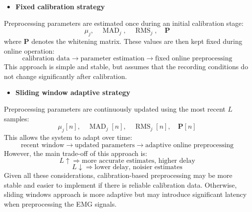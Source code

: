 \begin{itemize}
    \item \textbf{Fixed calibration strategy}
\end{itemize}
\noindent Preprocessing parameters are estimated once during an initial calibration stage:
    \[
        \mu_j,\quad \operatorname{MAD}_j,\quad \operatorname{RMS}_j,\quad \mathbf{P}
    \]
    where \(\mathbf{P}\) denotes the whitening matrix. These values are then kept fixed during online operation:
    \[
        \text{calibration data} \rightarrow \text{parameter estimation} \rightarrow \text{fixed online preprocessing}
    \]
    This approach is simple and stable, but assumes that the recording conditions do not change significantly after calibration.
\begin{itemize}
    \item \textbf{Sliding window adaptive strategy}
\end{itemize}
\noindent Preprocessing parameters are continuously updated using the most recent \(L\) samples:
    \[
        \mu_j[n],\quad \operatorname{MAD}_j[n],\quad \operatorname{RMS}_j[n],\quad \mathbf{P}[n]
    \]
    This allows the system to adapt over time:
    \[
        \text{recent window} \rightarrow \text{updated parameters} \rightarrow \text{adaptive online preprocessing}
    \]
    However, the main trade-off of this approach is:
    \[
        L \uparrow \Rightarrow \text{more accurate estimates, higher delay}
    \]
    \[
        L \downarrow \Rightarrow \text{lower delay, noisier estimates}
    \]
Given all these considerations, calibration-based preprocessing may be more stable and easier to implement if there is reliable calibration data. Otherwise, sliding windows approach is more adaptive but may introduce significant latency when preprocessing the EMG signals.
